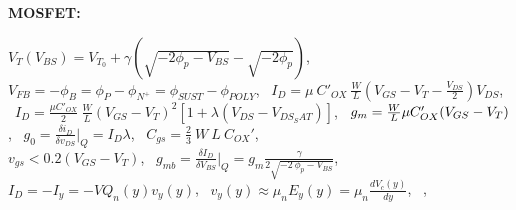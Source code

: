 \documentclass[a4paper,12pt]{article}
\newenvironment{ecuaciones}[1]{
  \noindent
  \begin{lrbox}{\ecuacionesbox}
  \begin{minipage}{\linewidth}\ignorespaces
  {\footnotesize\textbf{#1:}}
} {
  \end{minipage}
  \end{lrbox}%
  \makebox[\linewidth]{%
  \fbox{\usebox{\ecuacionesbox}}%
  }
  \par
  \vspace{0.5mm}
}
\begin{document}
  \begin{ecuaciones}{MOSFET}
  $ V_T (V_{BS}) = V_{T_0} + \gamma \left( \sqrt{-2\phi_p -V_{BS}}-\sqrt{-2 \phi_p} \right)
  $, \ 
  $V_{FB} = -\phi_B = \phi_P - \phi_{N^+} = \phi_{SUST} - \phi_{POLY}
  $, \ 
  $I_D = \mu \ C'_{OX} \ \frac{W}{L} \left( V_{GS} - V_T - \frac{V_{DS}}{2} \right) V_{DS}
  $, \ 
  $I_D = \frac{\mu C'_{OX} }{2} \ \frac{W}{L} \left( V_{GS} - V_T \right)^2 \left[ 1 + \lambda (V_{DS}-V_{{DS}_SAT} ) \right]
  $, \ 
  $\newline g_m = \frac{W}{L} \mu C'_{OX} (V_{GS} - V_T)
  $, \ 
  $g_0 = \frac{\delta i_D}{\delta v_{DS}} |_Q = I_D \lambda
  $, \ 
  $C_{gs} = \frac{2}{3} \ W \ L \ C_{OX}' 
  $, \ \\ 
  $v_{gs} <0.2 (V_{GS}-V_T) 
  $, \   
  $g_{mb} = \frac{\delta I_D}{\delta V_{BS}} |_Q  = g_m \frac{\gamma}{2 \sqrt{-2 \ \phi_p - V_{BS}}}
  $, \ 
  \\
  $I_D = - I_y = - V Q_n(y) v_y(y)
  $, \
  $ v_y(y) \approx \mu_n E_y(y) = \mu_n \frac{d V_c(y)}{dy}
  $, \
    $
  $, \
  \end{ecuaciones}
  



\end{document}
